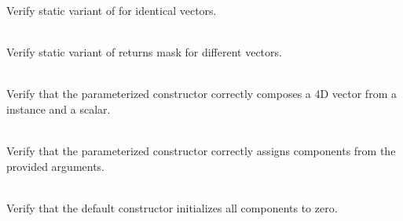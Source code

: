 \begin{DoxyRefList}
\label{test__test000087}%
%
Verify static variant of  for identical vectors.  
\item[{\parbox[t]{\linewidth}{Member \doxylink{_equality_tests_8cpp_aa43894fd37190b737b5b5e563d60e6b4}{Vector4\+DEquality\+\_\+\+Static\+Wrapper\+\_\+\+Inequality\+Returns\+Correct\+Boolean\+Mask} ()}}]\hfill \\
\label{test__test000102}%
%
Verify static variant of  returns  mask for different vectors.  
\item[{\parbox[t]{\linewidth}{Member \doxylink{vectors_2vector4d_2_initialization_tests_8cpp_af8befa6ae18bcf39392f885612b903c0}{Vector4\+DInitialization\+\_\+3\+DVector\+And\+Scalar\+Can\+Initialize\+A4\+DVector} ()}}]\hfill \\
\label{test__test000106}%
%
Verify that the  parameterized constructor correctly composes a 4D vector from a  instance and a scalar.  
\item[{\parbox[t]{\linewidth}{Member \doxylink{vectors_2vector4d_2_initialization_tests_8cpp_abf80101e26b45033f50dbfe802fb1703}{Vector4\+DInitialization\+\_\+\+Constructor\+Initializes\+Vectors\+With\+Correct\+Value} ()}}]\hfill \\
\label{test__test000104}%
%
Verify that the  parameterized constructor correctly assigns components from the provided arguments.  
\item[{\parbox[t]{\linewidth}{Member \doxylink{vectors_2vector4d_2_initialization_tests_8cpp_ab191c534e6251a89f78d3904cafa94a7}{Vector4\+DInitialization\+\_\+\+Empty\+Constructor\+Initializes\+Zero\+Vector} ()}}]\hfill \\
\label{test__test000103}%
%
Verify that the  default constructor initializes all components to zero.  
\item[{\parbox[t]{\linewidth}{Member \doxylink{vectors_2vector4d_2_initialization_tests_8cpp_aaea8a2b2a2c24e693c62c839b9213e84}{Vector4\+DInitialization\+\_\+\+Scalar\+And3\+DVector\+Can\+Initialize\+A4\+DVector} ()}}]\hfill \\

\end{DoxyRefList}
